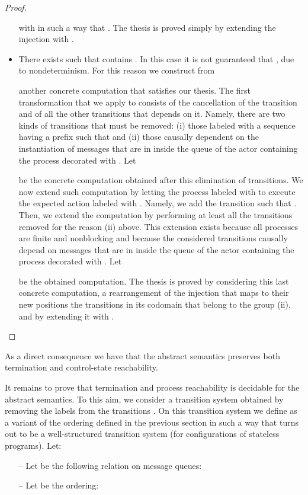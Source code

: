 \documentclass{LMCS}
\theoremstyle{plain}\newtheorem{proposition}[thm]{Proposition}
\theoremstyle{plain}\newtheorem{lemma}[thm]{Lemma}
\theoremstyle{plain}\newtheorem{theorem}[thm]{Theorem}
\theoremstyle{plain}\newtheorem{corollary}[thm]{Corollary}
\newif\ifconf \conffalse
\begin{document}
\begin{proof}
\begin{itemize}
with 
in such a way that .
The thesis is proved simply by extending the injection
 with .
\item
There exists 
such that  contains .
In this case it is not guaranteed
that , due to
nondeterminism. For this reason we construct from 

another concrete computation
that satisfies our thesis.
The first transformation that we apply to 
consists of the cancellation
of the transition  and of all the other transitions
that depends on it. Namely, there are two kinds of transitions that 
must be removed: (i) those labeled with a sequence having a prefix  such that
 and (ii) those causally dependent on the instantiation of messages
that are in  inside the queue of the actor containing the process
decorated with .
Let

be the concrete computation obtained after this elimination of transitions.
We now extend such computation 
by letting the process labeled with 
to execute the expected action labeled with .
Namely, we add
the transition 
such that .
Then, we extend the computation by performing at least
all the transitions removed for the reason (ii) above.
This extension exists because all processes are finite and
nonblocking and because the considered transitions causally depend on
messages that are in  inside the queue of the actor
containing the process decorated with .
Let

be the obtained computation.
The thesis is proved by considering this last concrete
computation, a rearrangement of the injection 
that maps to their new positions the transitions in its codomain
that belong to the group (ii), and by extending it with .\qedhere
\end{itemize}
\end{proof}

\noindent As a direct consequence we have that the abstract semantics preserves
both termination and 
control-state reachability.
\fi
\ifconf
\fi
It remains to prove that termination and process reachability is
decidable for the abstract semantics. To this aim, we consider
a transition system  obtained by removing the 
labels from the transitions .
On this transition system we 
define  as
a variant of the ordering
 defined in the previous section
in such a way that 
turns out to be a well-structured transition system (for configurations 
of stateless programs). 
Let:
\begin{itemize}
\item[--]
Let  be the following relation on message queues:


{\small

}

\item[--]
Let  be the ordering:



\end{itemize}
\end{document}
